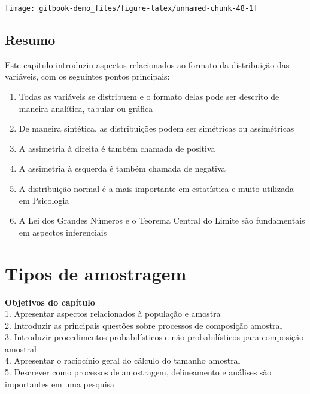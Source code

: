 \documentclass[
]{book}
\providecommand{\tightlist}{%
  \setlength{\itemsep}{0pt}\setlength{\parskip}{0pt}}
\begin{document}
\begin{center}\texttt{[image: gitbook-demo\_files/figure-latex/unnamed-chunk-48-1]} \end{center}

\hypertarget{resumo-3}{%
\section{Resumo}\label{resumo-3}}

\begin{explore}

Este capítulo introduziu aspectos relacionados ao formato da
distribuição das variáveis, com os seguintes pontos principais:

\begin{enumerate}
\def\labelenumi{\arabic{enumi}.}
\tightlist
\item
  Todas as variáveis se distribuem e o formato delas pode ser descrito
  de maneira analítica, tabular ou gráfica\\
\item
  De maneira sintética, as distribuições podem ser simétricas ou
  assimétricas\\
\item
  A assimetria à direita é também chamada de positiva\\
\item
  A assimetria à esquerda é também chamada de negativa\\
\item
  A distribuição normal é a mais importante em estatística e muito
  utilizada em Psicologia\\
\item
  A Lei dos Grandes Números e o Teorema Central do Limite são
  fundamentais em aspectos inferenciais\\
\end{enumerate}

\end{explore}

\hypertarget{tipos-de-amostragem}{%
\chapter{Tipos de amostragem}\label{tipos-de-amostragem}}

\begin{objectives}
\textbf{Objetivos do capítulo}\\
1. Apresentar aspectos relacionados à população e amostra\\
2. Introduzir as principais questões sobre processos de composição
amostral\\
3. Introduzir procedimentos probabilísticos e não-probabilísticos para
composição amostral\\
4. Apresentar o raciocínio geral do cálculo do tamanho amostral\\
5. Descrever como processos de amostragem, delineamento e análises são
importantes em uma pesquisa
\end{objectives}
\end{document}
